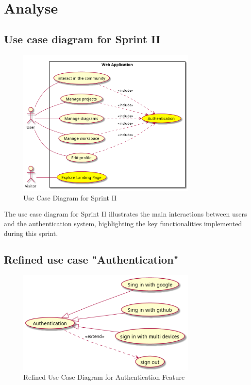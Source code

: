 \section{Analyse}

\subsection{Use case diagram for Sprint II}
\begin{figure}[H]
    \centering
    \includegraphics[width=0.8\textwidth]{conception/SprintII/use_case_diagrams/use_case_diagram_of_SprintII.png}
    \caption{Use Case Diagram for Sprint II}
    \label{fig:usecase_sprint2}
\end{figure}

The use case diagram for Sprint II illustrates the main interactions between users and the authentication system, highlighting the key functionalities implemented during this sprint.

\subsection{Refined use case "Authentication"}
\begin{figure}[H]
    \centering
    \includegraphics[width=0.8\textwidth]{conception/SprintII/use_case_diagrams/refined_use_case_feature_auth.png}
    \caption{Refined Use Case Diagram for Authentication Feature}
    \label{fig:refined_auth_usecase}
\end{figure}

